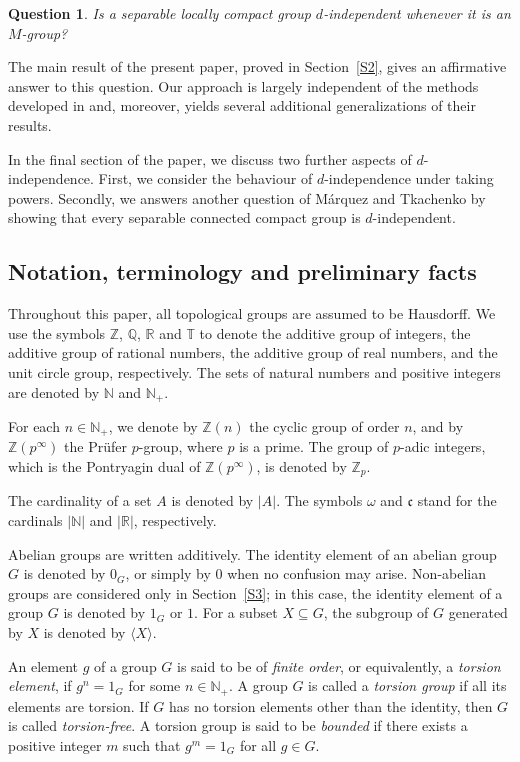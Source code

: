 \documentclass[12pt]{amsart}
\newtheorem{question}[theorem]{Question}
\theoremstyle{definition}
\theoremstyle{remark}
\newcommand{\N}{\mathbb{N}}
\newcommand{\hull}[1]{\langle #1 \rangle}
\def\c {{\mathfrak{c}}}
\begin{document}
\begin{question}
Is a separable locally compact group $d$-independent whenever it is an $M$-group?
\end{question}

The main result of the present paper, proved in Section~\ref{S2}, gives an affirmative answer to this question.
Our approach is largely independent of the methods developed in \cite{MT} and, moreover, yields several additional generalizations of their results.

In the final section of the paper, we discuss two further aspects of $d$-independence.
First, we consider the behaviour of $d$-independence under taking powers.
Secondly, we answers another question of Márquez and Tkachenko by showing that every separable connected compact group is $d$-independent.

\subsection{Notation, terminology and preliminary facts}

Throughout this paper, all topological groups are assumed to be Hausdorff.
We use the symbols $\mathbb{Z}$, $\mathbb{Q}$, $\mathbb{R}$ and $\mathbb{T}$
to denote the additive group of integers, the additive group of rational numbers,
the additive group of real numbers, and the unit circle group, respectively.
The sets of natural numbers and positive integers are denoted by $\N$ and $\N_{+}$.

For each $n\in \N_{+}$, we denote by $\mathbb{Z}(n)$ the cyclic group of order $n$,
and by $\mathbb{Z}(p^\infty)$ the Prüfer $p$-group, where $p$ is a prime.
The group of $p$-adic integers, which is the Pontryagin dual of
$\mathbb{Z}(p^\infty)$, is denoted by $\mathbb{Z}_p$.

The cardinality of a set $A$ is denoted by $|A|$.
The symbols $\omega$ and $\c$ stand for the cardinals $|\mathbb{N}|$ and
$|\mathbb{R}|$, respectively.

Abelian groups are written additively.
The identity element of an abelian group $G$ is denoted by $0_G$, or simply by
$0$ when no confusion may arise.
Non-abelian groups are considered only in Section~\ref{S3}; in this case, the
identity element of a group $G$ is denoted by $1_G$ or $1$.
For a subset $X\subseteq G$, the subgroup of $G$ generated by $X$ is denoted by
$\hull{X}$.

An element $g$ of a group $G$ is said to be of \emph{finite order}, or equivalently,
a \emph{torsion element}, if $g^n=1_G$ for some $n\in\N_{+}$.
A group $G$ is called a \emph{torsion group} if all its elements are torsion.
If $G$ has no torsion elements other than the identity, then $G$ is called
\emph{torsion-free}.
A torsion group is said to be \emph{bounded} if there exists a positive integer
$m$ such that $g^m=1_G$ for all $g\in G$.
\end{document}
